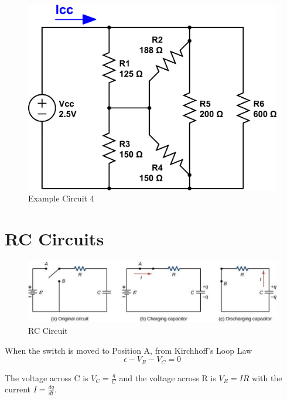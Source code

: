 \documentclass[14pt]{memoir}
\begin{document}
\begin{figure}[H]
\begin{center}
\includegraphics[scale=0.40]{fig/circuit4.png}
\caption{Example Circuit 4}
\label{fig:cir4}
\end{center}
\end{figure}


\section{RC Circuits}

\begin{figure}[H]
\begin{center}
\includegraphics[scale=0.50]{fig/fig_10_38.jpg}
\caption{RC Circuit}
\label{fig:10_38}
\end{center}
\end{figure}

When the switch is moved to Position A, from Kirchhoff's Loop Law
\begin{equation}
\epsilon - V_R - V_C =0
\end{equation}

The voltage across C is $V_C = \frac{q}{C}$ and the voltage across R is $V_R = IR$ with the current $I = \frac{dq}{dt}$.
\end{document}
